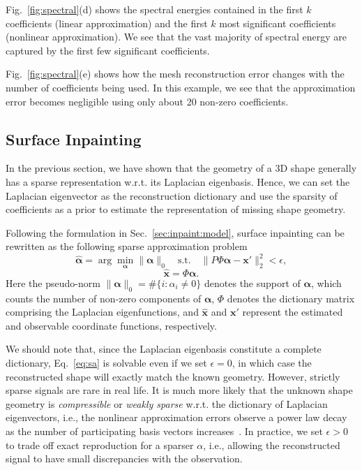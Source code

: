 Fig.~\ref{fig:spectral}(d) shows the spectral energies contained in
the first $k$ coefficients (linear approximation) and the first $k$
most significant coefficients (nonlinear approximation). We see that
the vast majority of spectral energy are captured by the first few
significant coefficients.

Fig.~\ref{fig:spectral}(e) shows how the mesh reconstruction error
changes with the number of coefficients being used. In this example,
we see that the approximation error becomes negligible using only
about 20 non-zero coefficients.

\subsection{Surface Inpainting}

In the previous section, we have shown that the geometry of a 3D shape
generally has a sparse representation w.r.t. its Laplacian
eigenbasis. Hence, we can set the Laplacian eigenvector as the
reconstruction dictionary and use the sparsity of coefficients as a
prior to estimate the representation of missing shape geometry.

Following the formulation in Sec.~\ref{sec:inpaint:model}, surface inpainting
can be rewritten as the following sparse approximation problem
\begin{equation}
\label{eq:sa}
\hat{\mathbf{\alpha}} = \arg\min_{\mathbf{\alpha}} \|\mathbf{\alpha}\|_0 \quad \text{s.t.} \quad \|P\Phi\mathbf{\alpha} - \mathbf{x}'\|_2^2 < \epsilon,
\end{equation}
\begin{equation}
\hat{\mathbf{x}} = \Phi \mathbf{\alpha}.
\end{equation}
Here the pseudo-norm $\|\mathbf{\alpha}\|_0 = \#\{ i : \alpha_i \neq
0\}$ denotes the support of $\mathbf{\alpha}$, which counts the number
of non-zero components of $\mathbf{\alpha}$, $\Phi$ denotes the
dictionary matrix comprising the Laplacian eigenfunctions, and
$\hat{\mathbf{x}}$ and $\mathbf{x}'$ represent the estimated and
observable coordinate functions, respectively.

We should note that, since the Laplacian eigenbasis constitute a
complete dictionary, Eq.~\ref{eq:sa} is solvable even if we set
$\epsilon=0$, in which case the reconstructed shape will exactly
match the known geometry. However, strictly sparse signals are rare in
real life. It is much more likely that the unknown shape geometry is
\emph{compressible} or \emph{weakly sparse} w.r.t. the dictionary of
Laplacian eigenvectors, i.e., the nonlinear approximation
errors observe a power law decay as the number of participating basis vectors
increases~\cite{Starck2010}. In practice, we set $\epsilon > 0$ to
trade off exact reproduction for a sparser $\alpha$, i.e., allowing the
reconstructed signal to have small discrepancies with the observation.

